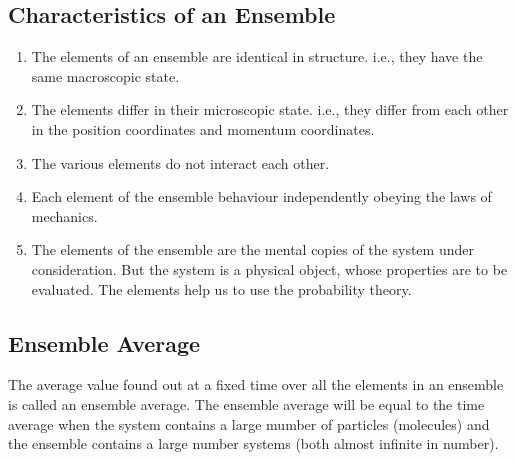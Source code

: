 \subsection{Characteristics of an Ensemble}
\begin{enumerate}
\item  The elements of an ensemble are identical in structure. i.e., they have the same macroscopic state.
\item  The elements differ in their microscopic state. i.e., they differ from each other in the position coordinates and momentum coordinates.
\item  The various elements do not interact each other.
\item  Each element of the ensemble behaviour independently obeying the laws of mechanics.
\item  The elements of the ensemble are the mental copies of the system under consideration. But the system is a physical object, whose properties are to be evaluated. The elements help us to use the probability theory.
\end{enumerate}
\subsection{Ensemble Average}
The average value found out at a fixed time over all the elements in an ensemble is called an ensemble average. The ensemble average will be equal to the time average when the system contains a large mumber of particles (molecules) and the ensemble contains a large number systems (both almost infinite in number).
